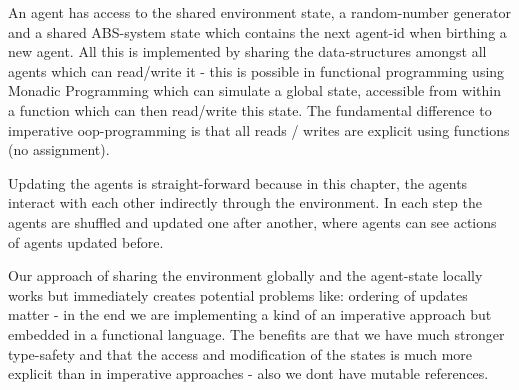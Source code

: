 An agent has access to the shared environment state, a random-number generator and a shared ABS-system state which contains the next agent-id when birthing a new agent. All this is implemented by sharing the data-structures amongst all agents which can read/write it - this is possible in functional programming using Monadic Programming which can simulate a global state, accessible from within a function which can then read/write this state. The fundamental difference to imperative oop-programming is that all reads / writes are explicit using functions (no assignment).

Updating the agents is straight-forward because in this chapter, the agents interact with each other indirectly through the environment. In each step the agents are shuffled and updated one after another, where agents can see actions of agents updated before. 

Our approach of sharing the environment globally and the agent-state locally works but immediately creates potential problems like: ordering of updates matter - in the end we are implementing a kind of an imperative approach but embedded in a functional language. The benefits are that we have much stronger type-safety and that the access and modification of the states is much more explicit than in imperative approaches - also we dont have mutable references.

